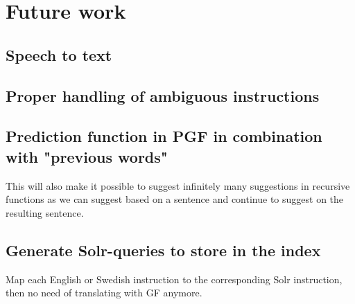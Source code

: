 \section{Future work}
\subsection{Speech to text}
\subsection{Proper handling of ambiguous instructions}
\subsection{Prediction function in PGF in combination with "previous words"}
This will also make it possible to suggest infinitely many suggestions in recursive functions as we can suggest based on a sentence and continue to suggest on the resulting sentence.
\subsection{Generate Solr-queries to store in the index}
Map each English or Swedish instruction to the corresponding Solr instruction, then no need of translating with GF anymore.